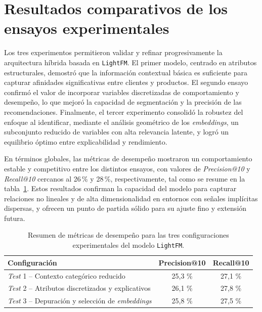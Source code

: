 \section{Resultados comparativos de los ensayos experimentales}

Los tres experimentos permitieron validar y refinar progresivamente la arquitectura híbrida basada en \texttt{LightFM}. El primer modelo, centrado en atributos estructurales, demostró que la información contextual básica es suficiente para capturar afinidades significativas entre clientes y productos. El segundo ensayo confirmó el valor de incorporar variables discretizadas de comportamiento y desempeño, lo que mejoró la capacidad de segmentación y la precisión de las recomendaciones. Finalmente, el tercer experimento consolidó la robustez del enfoque al identificar, mediante el análisis geométrico de los \textit{embeddings}, un subconjunto reducido de variables con alta relevancia latente, y logró un equilibrio óptimo entre explicabilidad y rendimiento.

En términos globales, las métricas de desempeño mostraron un comportamiento estable y competitivo entre los distintos ensayos, con valores de \textit{Precision@10} y \textit{Recall@10} cercanos al 26\,\% y 28\,\%, respectivamente, tal como se resume en la tabla~\ref{tab:resultados_lightfm}. Estos resultados confirman la capacidad del modelo para capturar relaciones no lineales y de alta dimensionalidad en entornos con señales implícitas dispersas, y ofrecen un punto de partida sólido para su ajuste fino y extensión futura.

\begin{table}[H]
	\centering
	\caption[Resultados comparativos de los ensayos con LightFM]{Resumen de métricas de desempeño para las tres configuraciones experimentales del modelo \texttt{LightFM}.}
	\begin{tabular}{l c c}    
		\toprule
		\textbf{Configuración} & \textbf{Precision@10} & \textbf{Recall@10} \\
		\midrule
		\textit{Test} 1 – Contexto categórico reducido & 25{,}3 \% & 27{,}1 \% \\
		\textit{Test} 2 – Atributos discretizados y explicativos & 26{,}1 \% & 27{,}8 \% \\
		\textit{Test} 3 – Depuración y selección de \textit{embeddings} & 25{,}8 \% & 27{,}5 \% \\
		\bottomrule
	\end{tabular}
	\label{tab:resultados_lightfm}
\end{table}